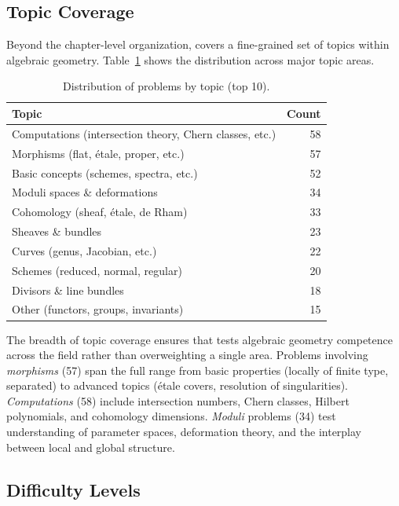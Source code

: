 \subsection{Topic Coverage}

Beyond the chapter-level organization, \ecagbench{} covers a fine-grained set of topics within algebraic geometry.
Table~\ref{tab:topics} shows the distribution across major topic areas.

\begin{table}[h]
\centering
\caption{Distribution of problems by topic (top 10).}
\label{tab:topics}
\small
\begin{tabular}{lr}
\toprule
\textbf{Topic} & \textbf{Count} \\
\midrule
Computations (intersection theory, Chern classes, etc.) & 58 \\
Morphisms (flat, \'etale, proper, etc.) & 57 \\
Basic concepts (schemes, spectra, etc.) & 52 \\
Moduli spaces \& deformations & 34 \\
Cohomology (sheaf, \'etale, de Rham) & 33 \\
Sheaves \& bundles & 23 \\
Curves (genus, Jacobian, etc.) & 22 \\
Schemes (reduced, normal, regular) & 20 \\
Divisors \& line bundles & 18 \\
Other (functors, groups, invariants) & 15 \\
\bottomrule
\end{tabular}
\end{table}

The breadth of topic coverage ensures that \ecagbench{} tests algebraic geometry competence across the field rather than overweighting a single area.
Problems involving \emph{morphisms} (57) span the full range from basic properties (locally of finite type, separated) to advanced topics (\'etale covers, resolution of singularities).
\emph{Computations} (58) include intersection numbers, Chern classes, Hilbert polynomials, and cohomology dimensions.
\emph{Moduli} problems (34) test understanding of parameter spaces, deformation theory, and the interplay between local and global structure.

\subsection{Difficulty Levels}


